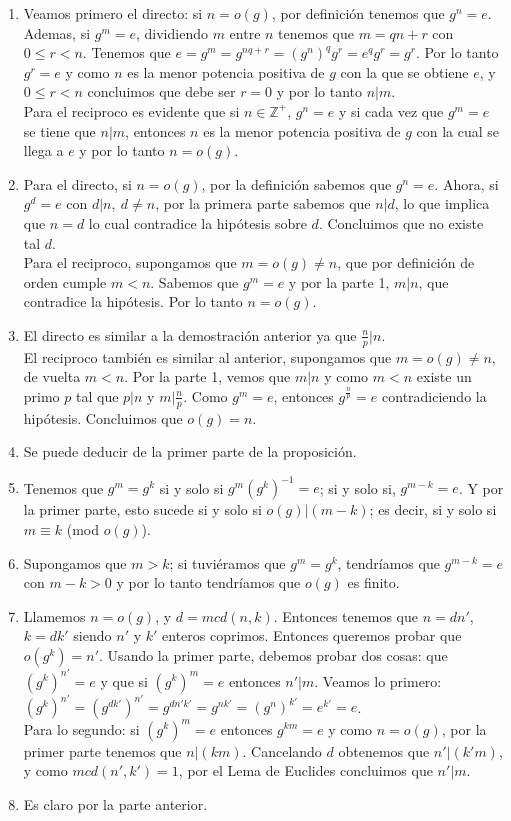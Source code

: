 \documentclass{report}
\begin{document}
\begin{myproof}
\begin{enumerate}
    \item Veamos primero el directo: si $n=o(g)$, por definición tenemos que $g^n=e$. Ademas, si $g^m=e$, dividiendo $m$ entre $n$ tenemos que $m=qn+r$ con $0\le r<n$. Tenemos que $e=g^m=g^{nq+r}=(g^n)^qg^r=e^qg^r=g^r$. Por lo tanto $g^r=e$ y como $n$ es la menor potencia positiva de $g$ con la que se obtiene $e$, y $0\le r<n$ concluimos que debe ser $r=0$ y por lo tanto $n|m$.\\Para el reciproco es evidente que si $n\in\mathbb{Z}^+$, $g^n=e$ y si cada vez que $g^m=e$ se tiene que $n|m$, entonces $n$ es la menor potencia positiva de $g$ con la cual se llega a $e$ y por lo tanto $n=o(g)$.
    \item Para el directo, si $n=o(g)$, por la definición sabemos que $g^n=e$. Ahora, si $g^d=e$ con $d|n,\ d\neq n$, por la primera parte sabemos que $n|d$, lo que implica que $n=d$ lo cual contradice la hipótesis sobre $d$. Concluimos que no existe tal $d$.\\Para el reciproco, supongamos que $m=o(g)\neq n$, que por definición de orden cumple $m<n$. Sabemos que $g^m=e$ y por la parte 1, $m|n$, que contradice la hipótesis. Por lo tanto $n=o(g)$.
    \item El directo es similar a la demostración anterior ya que $\frac{n}{p}|n$.\\El reciproco también es similar al anterior, supongamos que $m=o(g)\neq n$, de vuelta $m<n$. Por la parte 1, vemos que $m|n$ y como $m<n$ existe un primo $p$ tal que $p|n$ y $m|\frac{n}{p}$. Como $g^m=e$, entonces $g^{\frac{n}{p}}=e$ contradiciendo la hipótesis. Concluimos que $o(g)=n$.
    \item Se puede deducir de la primer parte de la proposición.
    \item Tenemos que $g^m=g^k$ si y solo si $g^m(g^k)^{-1}=e$; si y solo si, $g^{m-k}=e$. Y por la primer parte, esto sucede si y solo si $o(g)|(m-k)$; es decir, si y solo si $m\equiv k$ (mod $o(g)$).
    \item Supongamos que $m>k$; si tuviéramos que $g^m=g^k$, tendríamos que $g^{m-k}=e$ con $m-k>0$ y por lo tanto tendríamos que $o(g)$ es finito.
    \item Llamemos $n=o(g)$, y $d=mcd(n,k)$. Entonces tenemos que $n=dn'$, $k=dk'$ siendo $n'$ y $k'$ enteros coprimos. Entonces queremos probar que $o(g^k)=n'$. Usando la primer parte, debemos probar dos cosas: que $(g^k)^{n'}=e$ y que si $(g^k)^m=e$ entonces $n'|m$. Veamos lo primero: $(g^k)^{n'}=(g^{dk'})^{n'}=g^{dn'k'}=g^{nk'}=(g^n)^{k'}=e^{k'}=e$.\\Para lo segundo: si $(g^k)^m=e$ entonces $g^{km}=e$ y como $n=o(g)$, por la primer parte tenemos que $n|(km)$. Cancelando $d$ obtenemos que $n'|(k'm)$, y como $mcd(n',k')=1$, por el Lema de Euclides concluimos que $n'|m$.
    \item Es claro por la parte anterior.
\end{enumerate}
\end{myproof}
\end{document}
